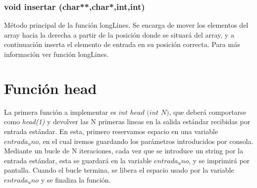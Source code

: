 \subsubsection{void insertar (char**,char*,int,int)}
Método principal de la función longLines. Se encarga de mover los elementos del array hacia la derecha a partir de la posición donde se situará  del array, y a continuación inserta el elemento de entrada en su posición correcta. Para más información ver función longLines. 
\section{Función head}
La primera función a implementar es $int$ $head$ $(int$ $N)$, que deberá comportarse como \textit{head(1)} y devolver las N primeras lineas en la salida estándar recibidas por entrada estándar.
En esta, primero reservamos espacio en una variable $entrada_uno$, en el cual iremos guardando los parámetros introducidos por consola. Mediante un bucle de N iteraciones, cada vez que se introduce un string por la entrada estándar, esta se guardará en la variable $entrada_uno$, y se imprimirá por pantalla.
Cuando el bucle termina, se libera el espacio usado por la variable $entrada_uno$ y se finaliza la función.

